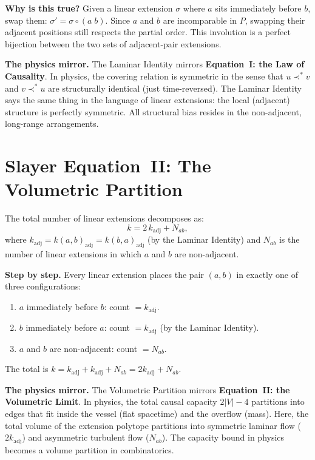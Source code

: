 \documentclass[11pt, a4paper, openany]{book}
\newcommand{\covers}{\prec^*}              %
\newcounter{thm}[chapter]
\begin{document}
\noindent
\textbf{Why is this true?} Given a linear extension $\sigma$ where $a$
sits immediately before $b$, swap them: $\sigma' = \sigma \circ (a\;b)$.
Since $a$ and $b$ are incomparable in $P$, swapping their adjacent
positions still respects the partial order. This involution is a perfect
bijection between the two sets of adjacent-pair extensions.

\medskip\noindent
\textbf{The physics mirror.} The Laminar Identity mirrors
\textbf{Equation~I: the Law of Causality}. In physics, the covering
relation is symmetric in the sense that $u \covers v$ and $v \covers u$
are structurally identical (just time-reversed). The Laminar Identity
says the same thing in the language of linear extensions: the local
(adjacent) structure is perfectly symmetric. All structural bias resides
in the non-adjacent, long-range arrangements.

\section{Slayer Equation~II: The Volumetric Partition}

\begin{theorem}\label{thm:volumetric-partition}
The total number of linear extensions decomposes as:
\begin{equation}\label{eq:volumetric-partition}
  k = 2\,k_{\mathrm{adj}} + N_{ab},
\end{equation}
where $k_{\mathrm{adj}} = k(a,b)_{\mathrm{adj}} =
k(b,a)_{\mathrm{adj}}$ (by the Laminar Identity) and $N_{ab}$ is the
number of linear extensions in which $a$ and $b$ are non-adjacent.
\end{theorem}

\noindent
\textbf{Step by step.} Every linear extension places the pair $(a,b)$
in exactly one of three configurations:
\begin{enumerate}
  \item $a$ immediately before $b$: count $= k_{\mathrm{adj}}$.
  \item $b$ immediately before $a$: count $= k_{\mathrm{adj}}$
    (by the Laminar Identity).
  \item $a$ and $b$ are non-adjacent: count $= N_{ab}$.
\end{enumerate}
The total is $k = k_{\mathrm{adj}} + k_{\mathrm{adj}} + N_{ab}
= 2k_{\mathrm{adj}} + N_{ab}$.

\medskip\noindent
\textbf{The physics mirror.} The Volumetric Partition mirrors
\textbf{Equation~II: the Volumetric Limit}. In physics, the total
causal capacity $2|V| - 4$ partitions into edges that fit inside the
vessel (flat spacetime) and the overflow (mass). Here, the total volume
of the extension polytope partitions into symmetric laminar flow
($2k_{\mathrm{adj}}$) and asymmetric turbulent flow ($N_{ab}$).
The capacity bound in physics becomes a volume partition in
combinatorics.
\end{document}
